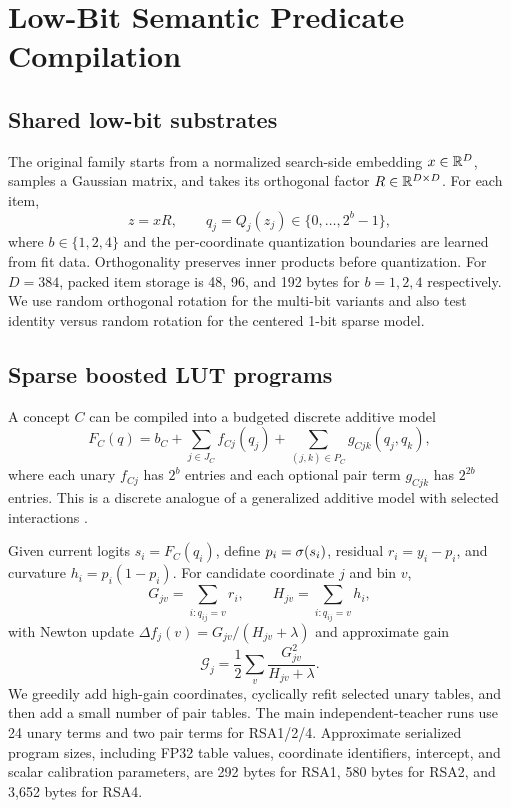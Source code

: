 
\section{Low-Bit Semantic Predicate Compilation}

\subsection{Shared low-bit substrates}
The original \rsa family starts from a normalized search-side embedding $x\in\mathbb{R}^D$, samples a Gaussian matrix, and takes its orthogonal factor $R\in\mathbb{R}^{D\times D}$. For each item,
\begin{equation}
    z=xR,\qquad q_j=Q_j(z_j)\in\{0,\ldots,2^b-1\},
    \label{eq:rsa_substrate}
\end{equation}
where $b\in\{1,2,4\}$ and the per-coordinate quantization boundaries are learned from fit data. Orthogonality preserves inner products before quantization. For $D=384$, packed item storage is 48, 96, and 192 bytes for $b=1,2,4$ respectively. We use random orthogonal rotation for the multi-bit \rsa variants and also test identity versus random rotation for the centered 1-bit sparse model.

\subsection{Sparse boosted LUT programs}
A concept $C$ can be compiled into a budgeted discrete additive model
\begin{equation}
F_C(q)=b_C+\sum_{j\in J_C} f_{Cj}(q_j)
+\sum_{(j,k)\in P_C} g_{Cjk}(q_j,q_k),
\label{eq:program}
\end{equation}
where each unary $f_{Cj}$ has $2^b$ entries and each optional pair term $g_{Cjk}$ has $2^{2b}$ entries. This is a discrete analogue of a generalized additive model with selected interactions \citep{lou2013ga2m,nori2019interpretml}.

Given current logits $s_i=F_C(q_i)$, define $p_i=\sigma(s_i)$, residual $r_i=y_i-p_i$, and curvature $h_i=p_i(1-p_i)$. For candidate coordinate $j$ and bin $v$,
\begin{equation}
G_{jv}=\sum_{i:q_{ij}=v}r_i,\qquad
H_{jv}=\sum_{i:q_{ij}=v}h_i ,
\end{equation}
with Newton update $\Delta f_j(v)=G_{jv}/(H_{jv}+\lambda)$ and approximate gain
\begin{equation}
\mathcal{G}_j=\frac12\sum_v\frac{G_{jv}^2}{H_{jv}+\lambda}.
\end{equation}
We greedily add high-gain coordinates, cyclically refit selected unary tables, and then add a small number of pair tables. The main independent-teacher runs use 24 unary terms and two pair terms for RSA1/2/4. Approximate serialized program sizes, including FP32 table values, coordinate identifiers, intercept, and scalar calibration parameters, are 292 bytes for RSA1, 580 bytes for RSA2, and 3,652 bytes for RSA4.

